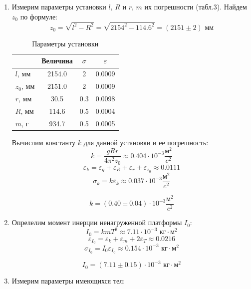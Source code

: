 \documentclass[a4paper, 10pt]{article}%
\begin{document}
\begin{enumerate}
		\item Измерим параметры установки $l$, $R$ и $r$, $m$ их погрешности (табл.3). Найдем $z_0$ по формуле:
		\[z_0 = \sqrt{l^2 - R^2} = \sqrt{2154^2 - 114.6^2} = (2151 \pm 2) \text{ мм}\]
		
		\begin{table}[h]
			\centering
			\caption{Параметры установки}
			\begin{tabular}{|l|c|c|c|}
				\hline
				& Величина & $\sigma$ & $\varepsilon$ \\
				\hline
				$l$, мм & 2154.0 & 2 & 0.0009 \\
				\hline
				$z_0$, мм & 2151.0 & 2 & 0.0009 \\
				\hline
				$r$, мм & 30.5 & 0.3 & 0.0098 \\
				\hline
				$R$, мм & 114.6 & 0.5 & 0.0004 \\
				\hline
				$m$, г & 934.7 & 0.5 & 0.0005 \\
				\hline
			\end{tabular}
		\end{table}
		
		Вычислим константу $k$ для данной установки и ее погрешность:
		\[k = \dfrac{gRr}{4\pi^2z_0} \approx 0.404 \cdot 10^{-3} \frac{\text{м}^2}{c^2}\]
		\[\varepsilon_k = \varepsilon_g + \varepsilon_R + \varepsilon_r + \varepsilon_{z_0} \approx 0.0111\]
		\[\sigma_k = k\varepsilon_k \approx 0.037 \cdot 10^{-3} \frac{\text{м}^2}{c^2}\]
		
		\[k = \left(0.40 \pm 0.04\right) \cdot 10^{-3} \frac{\text{м}^2}{c^2}\]
		
		\item Опрелелим момент инерции ненагруженной платформы $I_0$:
		\[I_0 = kmT^2 \approx 7.11 \cdot 10^{-3} \text{ кг}\cdot\text{м}^2\]
		\[\varepsilon_{I_0} = \varepsilon_k + \varepsilon_m + 2\varepsilon_T \approx 0.0216\]
		\[\sigma_{I_0} = I_0\varepsilon_{I_0} \approx 0.154 \cdot 10^{-3} \text{ кг}\cdot\text{м}^2\]
		
		\[I_0 = (7.11 \pm 0.15) \cdot 10^{-3} \text{ кг}\cdot\text{м}^2\]
		
		\item Измерим параметры имеющихся тел:
		

\end{enumerate}
\end{document}
